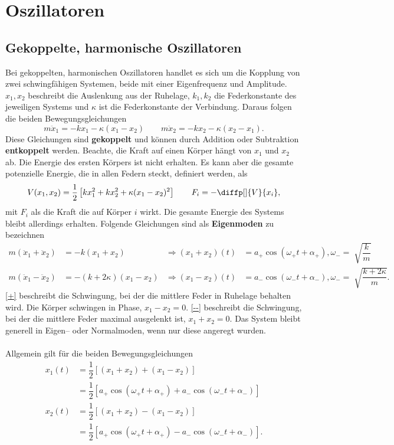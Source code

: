 \documentclass[a4paper,12pt]{article}
\numberwithin{equation}{section}
\begin{document}
\newpage
\section{Oszillatoren}
\subsection{Gekoppelte, harmonische Oszillatoren}
Bei gekoppelten, harmonischen Oszillatoren handlet es sich um die Kopplung von zwei schwingfähigen Systemen, beide mit einer Eigenfrequenz und Amplitude. $x_1,x_2$ beschreibt die Auslenkung aus der Ruhelage, $k_1,k_2$ die Federkonstante des jeweiligen Systems und $\kappa $ ist die Federkonstante der Verbindung. Daraus folgen die beiden Bewegungsgleichungen
\[ 
        m\ddot{x}_1=-kx_1-\kappa (x_1-x_2)\qquad m\ddot{x}_2=-kx_2-\kappa (x_2-x_1)
.\] 
Diese Gleichungen sind \textbf{gekoppelt} und können durch Addition oder Subtraktion \textbf{entkoppelt} werden. Beachte, die Kraft auf einen Körper hängt von $x_1$ und $x_2$ ab. Die Energie des ersten Körpers ist nicht erhalten. Es kann aber die gesamte potenzielle Energie, die in allen Federn steckt, definiert werden, als
\[ 
        V(x_1,x_2)=\dfrac{1}{2}\left[kx_1^2+kx_2^2+\kappa (x_1-x_2)^2\right]\qquad F_i=-\diffp[]{V}{x_i}
,\] 
mit $F_i$ als die Kraft die auf Körper $i$ wirkt. Die gesamte Energie des Systems bleibt allerdings erhalten. Folgende Gleichungen sind als \textbf{Eigenmoden} zu bezeichnen
\begin{align*}
        m(\ddot{x}_1+\ddot{x}_2)&=-k(x_1+x_2)&\Rightarrow (x_1+x_2)(t)&=a_+\cos (\omega _+t+\alpha _+),\omega _-=\sqrt[]{\dfrac{k}{m}}\tag{+}\label{+}\\ %
        m(\ddot{x}_1-\ddot{x}_2)&=-(k+2\kappa )(x_1-x_2)&\Rightarrow (x_1-x_2)(t)&=a_-\cos (\omega _-t+\alpha _-),\omega _-=\sqrt[]{\dfrac{k+2\kappa }{m}}\tag{--}\label{--} %
.\end{align*}
\eqref{+} beschreibt die Schwingung, bei der die mittlere Feder in Ruhelage behalten wird. Die Körper schwingen in Phase, $x_1-x_2=0$. \eqref{--} beschreibt die Schwingung, bei der die mittlere Feder maximal ausgelenkt ist, $x_1+x_2=0$. Das System bleibt generell in Eigen-- oder Normalmoden, wenn nur diese angeregt wurden.\\\\
Allgemein gilt für die beiden Bewegungsgleichungen
\begin{align*}
        x_1(t)&=\dfrac{1}{2}\left[(x_1+x_2)+(x_1-x_2)\right]\\
              &=\dfrac{1}{2}\left[a_+\cos (\omega _+t+\alpha _+)+a_-\cos (\omega _-t+\alpha _-)\right]\\
        x_2(t)&=\dfrac{1}{2}\left[(x_1+x_2)-(x_1-x_2)\right]\\
              &=\dfrac{1}{2}\left[a_+\cos (\omega _+t+\alpha _+)-a_-\cos (\omega _-t+\alpha _-)\right]
.\end{align*}
\end{document}
